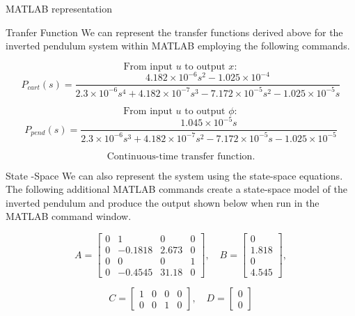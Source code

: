 \begin{frame}{MATLAB representation}
\protect{}\label{matlab-representation}
\begin{block}{Tranfer Function}
\protect{}\label{tranfer-function}
We can represent the transfer functions derived above for the inverted
pendulum system within MATLAB employing the following commands.

\[\text{From input } u \text{ to output } x:\] \[P_{cart}(s) = 
\frac{4.182 \times 10^{-6} s^{2} - 1.025 \times 10^{-4}}
     {2.3 \times 10^{-6} s^{4} + 4.182 \times 10^{-7} s^{3} - 7.172 \times 10^{-5} s^{2} - 1.025 \times 10^{-5} s}\]

\[\text{From input } u \text{ to output } \phi:\] \[P_{pend}(s) =
\frac{1.045 \times 10^{-5} s}
     {2.3 \times 10^{-6} s^{3} + 4.182 \times 10^{-7} s^{2} - 7.172 \times 10^{-5} s - 1.025 \times 10^{-5}}\]

\[\text{Continuous-time transfer function.}\]
\end{block}

\begin{block}{State -Space}
\protect{}\label{state--space}
We can also represent the system using the state-space equations. The
following additional MATLAB commands create a state-space model of the
inverted pendulum and produce the output shown below when run in the
MATLAB command window.

\begin{equation}
A = 
\begin{bmatrix}
0      & 1       & 0     & 0 \\
0      & -0.1818 & 2.673 & 0 \\
0      & 0       & 0     & 1 \\
0      & -0.4545 & 31.18 & 0
\end{bmatrix}, \quad
B =
\begin{bmatrix}
0 \\ 1.818 \\ 0 \\ 4.545
\end{bmatrix},
\end{equation}

\begin{equation}
C =
\begin{bmatrix}
1 & 0 & 0 & 0 \\
0 & 0 & 1 & 0
\end{bmatrix}, \quad
D =
\begin{bmatrix}
0 \\ 0
\end{bmatrix}
\end{equation}
\end{block}
\end{frame}

